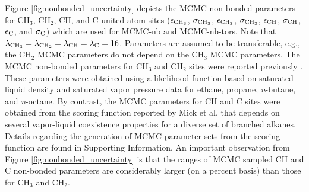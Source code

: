 \documentclass[preprint,review,12pt]{elsarticle}
\begin{document}
	Figure \ref{fig:nonbonded_uncertainty} depicts the MCMC non-bonded parameters for CH$_3$, CH$_2$, CH, and C united-atom sites ($\epsilon_{\rm CH_3}$, $\sigma_{\rm CH_3}$, $\epsilon_{\rm CH_2}$, $\sigma_{\rm CH_2}$, $\epsilon_{\rm CH}$, $\sigma_{\rm CH}$, $\epsilon_{\rm C}$, and $\sigma_{\rm C}$) which are used for MCMC-nb and MCMC-nb-tors. Note that $\lambda_{\rm CH_3} = \lambda_{\rm CH_2} = \lambda_{\rm CH} = \lambda_{\rm C} = 16$. Parameters are assumed to be transferable, e.g., the CH$_2$ MCMC parameters do not depend on the CH$_3$ MCMC parameters. The MCMC non-bonded parameters for CH$_3$ and CH$_2$ sites were reported previously \cite{Postdoc_2}. These parameters were obtained using a likelihood function based on saturated liquid density and saturated vapor pressure data for ethane, propane, \textit{n}-butane, and \textit{n}-octane. By contrast, the MCMC parameters for CH and C sites were obtained from the scoring function reported by Mick et al. \cite{Potoff_branched} that depends on several vapor-liquid coexistence properties for a diverse set of branched alkanes. Details regarding the generation of MCMC parameter sets from the scoring function are found in Supporting Information. An important observation from Figure \ref{fig:nonbonded_uncertainty} is that the ranges of MCMC sampled CH and C non-bonded parameters are considerably larger (on a percent basis) than those for CH$_3$ and CH$_2$.
	
	
	
    
\end{document}
